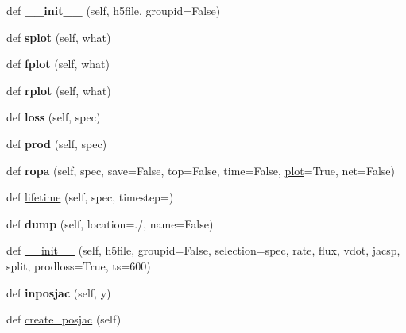\begin{DoxyCompactItemize}
def {\bfseries \+\_\+\+\_\+init\+\_\+\+\_\+} (self, h5file, groupid=False)
\item 
\mbox{\label{classzhdf_1_1new_a3f6a3860bd2fdb82ad44de533a8a053f}} 
def {\bfseries splot} (self, what)
\item 
\mbox{\label{classzhdf_1_1new_af2bd6b77614b804f8d160fe126568f6c}} 
def {\bfseries fplot} (self, what)
\item 
\mbox{\label{classzhdf_1_1new_ac2da0205a780c8e63238b999c9f8e281}} 
def {\bfseries rplot} (self, what)
\item 
\mbox{\label{classzhdf_1_1new_af05896dbaac383f107e46d76287d0ea0}} 
def {\bfseries loss} (self, spec)
\item 
\mbox{\label{classzhdf_1_1new_a7e698f744d38ec1a6a308a21fafa63e5}} 
def {\bfseries prod} (self, spec)
\item 
\mbox{\label{classzhdf_1_1new_aad68ddbb6791ca56a8495047091ccd72}} 
def {\bfseries ropa} (self, spec, save=False, top=False, time=False, \mbox{\hyperlink{classzhdf_1_1new_a9745f192f8c6f7e375a6fada1f44525a}{plot}}=True, net=False)
\item 
def \mbox{\hyperlink{classzhdf_1_1new_a43a5465a38adcc9306726e9b7c420e03}{lifetime}} (self, spec, timestep=\textquotesingle{}\textquotesingle{})
\item 
\mbox{\label{classzhdf_1_1new_a87ee987ac4b5f4fea8cc03cd78744f81}} 
def {\bfseries dump} (self, location=\textquotesingle{}./\textquotesingle{}, name=False)
\item 
def \mbox{\hyperlink{classzhdf_1_1new_add2078473b549c2c0ec767646c9fb3f5}{\+\_\+\+\_\+init\+\_\+\+\_\+}} (self, h5file, groupid=False, selection=\textquotesingle{}spec, rate, flux, vdot, jacsp, split, prodloss=True, ts=600)
\item 
\mbox{\label{classzhdf_1_1new_a9a5792f7565526f92aaa0ec8037a33cb}} 
def {\bfseries inposjac} (self, y)
\item 
def \mbox{\hyperlink{classzhdf_1_1new_ac2f471d2887d2c09c702bb16e06dda73}{create\+\_\+posjac}} (self)
\item 

\end{DoxyCompactItemize}
